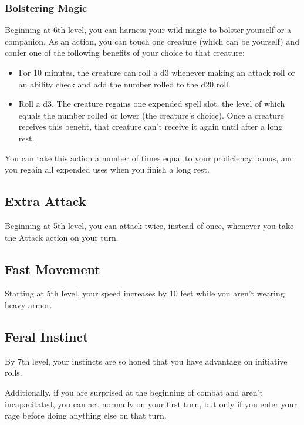 {\subsubsection*{Bolstering Magic}
Beginning at 6th level, you can harness your wild magic to bolster yourself or a companion. As an action, you can touch one creature (which can be yourself) and confer one of the following benefits of your choice to that creature:

\begin{itemize}
	\item For 10 minutes, the creature can roll a d3 whenever making an attack roll or an ability check and add the number rolled to the d20 roll.
	\item Roll a d3. The creature regains one expended spell slot, the level of which equals the number rolled or lower (the creature’s choice). Once a creature receives this benefit, that creature can’t receive it again until after a long rest.
\end{itemize}
You can take this action a number of times equal to your proficiency bonus, and you regain all expended uses when you finish a long rest.
\subsection*{Extra Attack}
Beginning at 5th level, you can attack twice, instead of once, whenever you take the Attack action on your turn.
\subsection*{Fast Movement}
Starting at 5th level, your speed increases by 10 feet while you aren't wearing heavy armor.
\subsection*{Feral Instinct}
By 7th level, your instincts are so honed that you have advantage on initiative rolls.

Additionally, if you are surprised at the beginning of combat and aren't incapacitated, you can act normally on your first turn, but only if you enter your rage before doing anything else on that turn.
}